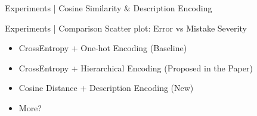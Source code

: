 \begin{frame}{Experiments | Cosine Similarity \& Description Encoding}
  
\end{frame}

\begin{frame}{Experiments | Comparison}
  Scatter plot: Error vs Mistake Severity
  \begin{itemize}
    \item CrossEntropy + One-hot Encoding (Baseline)
    \item CrossEntropy + Hierarchical Encoding (Proposed in the Paper)
    \item Cosine Distance + Description Encoding (New)
    \item More?
  \end{itemize}
\end{frame}
